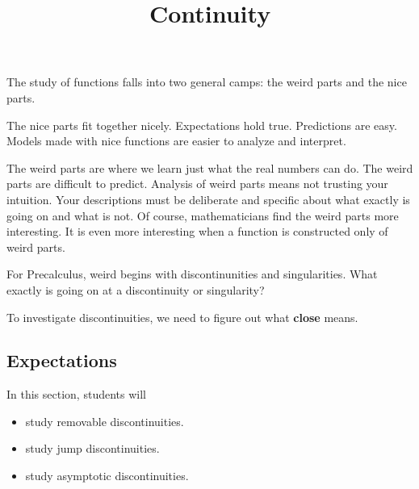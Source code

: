 \documentclass{ximera}
\title{Continuity}
\begin{document}
\begin{abstract}
\end{abstract}
\maketitle






The study of functions falls into two general camps: the weird parts and the nice parts.  

The nice parts fit together nicely. Expectations hold true. Predictions are easy. Models made with nice functions are easier to analyze and interpret.


The weird parts are where we learn just what the real numbers can do.  The weird parts are difficult to predict. Analysis of weird parts means not trusting your intuition.  Your descriptions must be deliberate and specific about what exactly is going on and what is not.  Of course, mathematicians find the weird parts more interesting.  It is even more interesting when a function is constructed only of weird parts.


For Precalculus, weird begins with discontinunities and singularities.  What exactly is going on at a discontinuity or singularity?


To investigate discontinuities, we need to figure out what \textbf{close} means.




\subsection{Expectations}


\begin{sectionOutcomes}
In this section, students will 

\begin{itemize}
\item study removable discontinuities.
\item study jump discontinuities.
\item study asymptotic discontinuities.

\end{itemize}
\end{sectionOutcomes}
\end{document}
